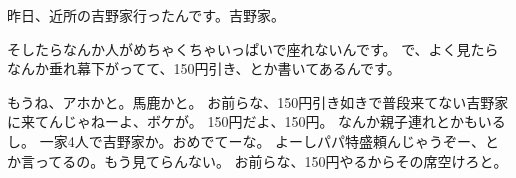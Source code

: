 \documentclass[lualatex,a5paper,ja=standard]{bxjsarticle}
\begin{document}
昨日、近所の吉野家行ったんです。吉野家。

そしたらなんか人がめちゃくちゃいっぱいで座れないんです。
で、よく見たらなんか垂れ幕下がってて、150円引き、とか書いてあるんです。

もうね、アホかと。馬鹿かと。
お前らな、150円引き如きで普段来てない吉野家に来てんじゃねーよ、ボケが。
150円だよ、150円。
なんか親子連れとかもいるし。
一家4人で吉野家か。おめでてーな。
よーしパパ特盛頼んじゃうぞー、とか言ってるの。もう見てらんない。
お前らな、150円やるからその席空けろと。
\end{document}

